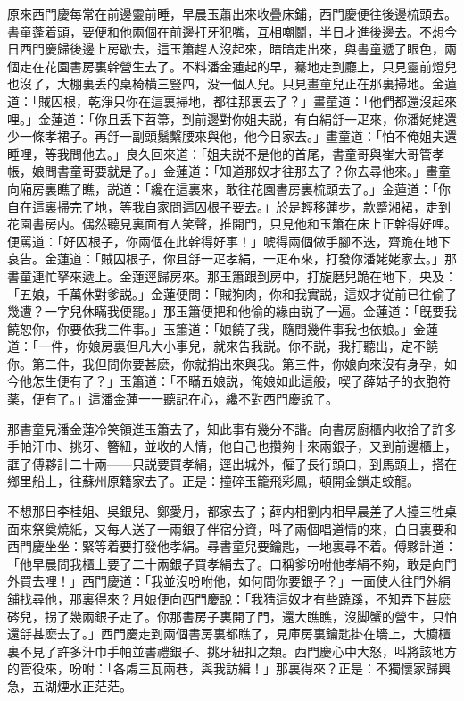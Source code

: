 原來西門慶每常在前邊靈前睡，早晨玉蕭出來收疊床鋪，西門慶便往後邊梳頭去。書童蓬着頭，要便和他兩個在前邊打牙犯嘴，互相嘲鬬，半日才進後邊去。不想今日西門慶歸後邊上房歇去，這玉簫趕人沒起來，暗暗走出來，與書童遞了眼色，兩個走在花園書房裏幹營生去了。不料潘金蓮起的早，驀地走到廳上，只見靈前燈兒也沒了，大棚裏丢的桌椅横三豎四，没一個人兒。只見畫童兒正在那裏掃地。金蓮道：「賊囚根，乾淨只你在這裏掃地，都往那裏去了？」畫童道：「他們都還沒起來哩。」金蓮道：「你且丢下苕箒，到前邊對你姐夫説，有白絹㧱一疋來，你潘姥姥還少一條孝裙子。再㧱一副頭鬚繫腰來與他，他今日家去。」畫童道：「怕不俺姐夫還睡哩，等我問他去。」良久回來道：「姐夫説不是他的首尾，書童哥與崔大哥管孝帳，娘問書童哥要就是了。」金蓮道：「知道那奴才往那去了？你去尋他來。」畫童向廂房裏瞧了瞧，説道：「纔在這裏來，敢往花園書房裏梳頭去了。」金蓮道：「你自在這裏掃完了地，等我自家問這囚根子要去。」於是輕移蓮步，款蹙湘裙，走到花園書房内。偶然聽見裏面有人笑聲，推開門，只見他和玉簫在床上正幹得好哩。便罵道：「好囚根子，你兩個在此幹得好事！」唬得兩個做手腳不迭，齊跪在地下哀告。金蓮道：「賊囚根子，你且㧱一疋孝絹，一疋布來，打發你潘姥姥家去。」那書童連忙拏來遞上。金蓮逕歸房來。那玉簫跟到房中，打旋磨兒跪在地下，央及：「五娘，千萬休對爹説。」金蓮便問：「賊狗肉，你和我實説，這奴才従前已往偷了幾遭？一字兒休瞞我便罷。」那玉簫便把和他偷的緣由説了一遍。金蓮道：「旣要我饒恕你，你要依我三件事。」玉簫道：「娘饒了我，隨問幾件事我也依娘。」金蓮道：「一件，你娘房裏但凡大小事兒，就來告我説。你不説，我打聽出，定不饒你。第二件，我但問你要甚麽，你就捎出來與我。第三件，你娘向來沒有身孕，如今他怎生便有了？」玉簫道：「不瞞五娘説，俺娘如此這般，喫了薛姑子的衣胞符薬，便有了。」這潘金蓮一一聽記在心，纔不對西門慶說了。

那書童見潘金蓮冷笑領進玉簫去了，知此事有幾分不諧。向書房廚櫃内收拾了許多手帕汗巾、挑牙、簪紐，並收的人情，他自己也攢夠十來兩銀子，又到前邊櫃上，誆了傅夥計二十兩——只説要買孝絹，逕出城外，僱了長行頭口，到馬頭上，搭在鄉里船上，往蘇州原籍家去了。正是：撞碎玉籠飛彩鳳，頓開金鎖走蛟龍。

不想那日李桂姐、吳銀兒、鄭愛月，都家去了；薛内相劉内相早晨差了人擡三牲桌面來祭奠燒紙，又每人送了一兩銀子伴宿分資，呌了兩個唱道情的來，白日裏要和西門慶坐坐：緊等着要打發他孝絹。尋書童兒要鑰匙，一地裏尋不着。傅夥計道：「他早晨問我櫃上要了二十兩銀子買孝絹去了。口稱爹吩咐他孝絹不夠，敢是向門外買去哩！」西門慶道：「我並沒吩咐他，如何問你要銀子？」一面使人往門外絹舖找尋他，那裏得來？月娘便向西門慶說：「我猜這奴才有些蹺蹊，不知弄下甚麽硶兒，拐了幾兩銀子走了。你那書房子裏開了門，還大瞧瞧，沒脚蟹的營生，只怕還㧱甚麽去了。」西門慶走到兩個書房裏都瞧了，見庫房裏鑰匙掛在墻上，大櫥櫃裏不見了許多汗巾手帕並書禮銀子、挑牙紐扣之類。西門慶心中大怒，呌將該地方的管役來，吩咐：「各䖏三瓦兩巷，與我訪緝！」那裏得來？正是：不獨懷家歸興急，五湖煙水正茫茫。

